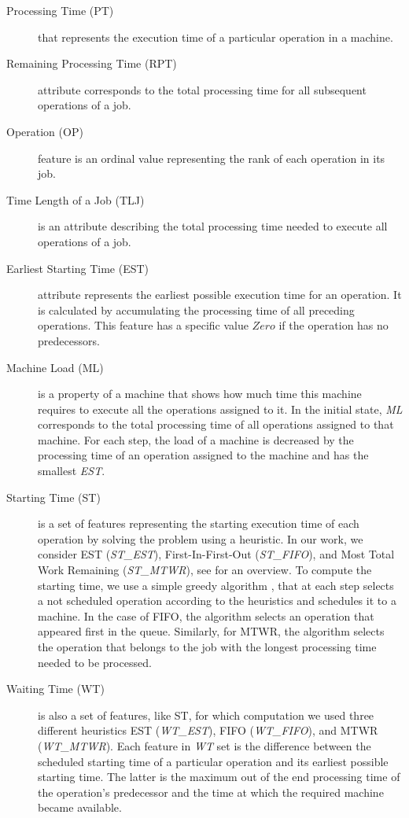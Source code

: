 \documentclass[runningheads]{llncs}
\newcommand{\stest}{\textit{ST\_EST}}
\newcommand{\stmtwr}{\textit{ST\_MTWR}}
\newcommand{\stfifo}{\textit{ST\_FIFO}}
\newcommand{\wtest}{\textit{WT\_EST}}
\newcommand{\wtmtwr}{\textit{WT\_MTWR}}
\newcommand{\wtfifo}{\textit{WT\_FIFO}}
\begin{document}
\begin{description}
  \item[Processing Time (PT)] that represents the execution time of a particular operation in a machine.
  
  \item[Remaining Processing Time (RPT)] attribute corresponds to the total processing time for all subsequent operations of a job.
  
  \item[Operation (OP)] feature is an ordinal value representing the rank of each operation in its job.
  
  \item[Time Length of a Job (TLJ)] is an attribute describing the total processing time needed to execute all operations of a job. 
  
  \item[Earliest Starting Time (EST)] attribute represents the earliest possible execution time for an operation. It is calculated by accumulating the processing time of all preceding operations. This feature has a specific value $\mathit{Zero}$ if the operation has no predecessors.
  
  \item[Machine Load (ML)] is a property of a machine that shows how much time this machine requires to execute all the operations assigned to it. In the initial state, \textit{ML} corresponds to the total processing time of all operations assigned to that machine. For each step, the load of a machine is decreased by the processing time of an operation assigned to the machine and has the smallest \textit{EST}.
  
  \item[Starting Time (ST)] is a set of features representing the starting execution time of each operation by solving the problem using a heuristic. In our work, we consider EST (\stest), First-In-First-Out (\stfifo), and Most Total Work Remaining (\stmtwr), see \cite{jones1998survey} for an overview.
To compute the starting time, we use a simple greedy algorithm \cite{el2020job}, that at each step selects a not scheduled operation according to the heuristics and schedules it to a machine. In the case of FIFO, the algorithm selects an operation that appeared first in the queue. Similarly, for MTWR, the algorithm selects the operation that belongs to the job with the longest processing time needed to be processed.

  \item[Waiting Time (WT)] is also a set of features, like ST, for which computation we used three different heuristics EST (\wtest), FIFO (\wtfifo), and MTWR (\wtmtwr). Each feature in \textit{WT} set is the difference between the scheduled starting time of a particular operation and its earliest possible starting time. The latter is the maximum out of the end processing time of the operation's predecessor and the time at which the required machine became available.
\end{description}
\end{document}
